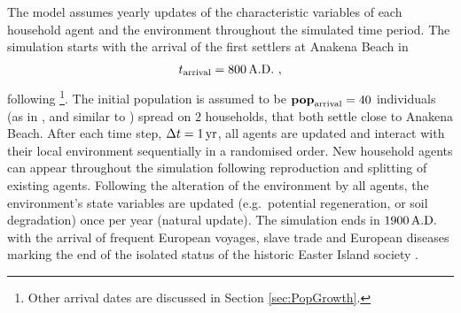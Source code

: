 The model assumes yearly updates of the characteristic variables of each household agent and the environment throughout the simulated time period.
The simulation starts with the arrival of the first settlers at Anakena Beach in
\begin{equation}
t_\text{arrival} = 800\, {\rm A.D.}\ ,
\end{equation}
following \citet{Bahn2017}\footnote{Other arrival dates are discussed in Section \ref{sec:PopGrowth}.}.
The initial population is assumed to be $\mathbf{pop}_{\rm arrival} = 40$ individuals (as in \citet{Brander1998}, and similar to \citet{Brandt2015}) spread on $2$ households, that both settle close to Anakena Beach.
After each time step, $\Delta t=1\,{\rm yr}$, all agents are updated and interact with their local environment sequentially in a randomised order. 
New household agents can appear throughout the simulation following reproduction and splitting of existing agents. 
Following the alteration of the environment by all agents, the environment's state variables are updated (e.g.\ potential regeneration, or soil degradation) once per year (natural update).
The simulation ends in $1900\, {\rm A.D.}$ with the arrival of frequent European voyages, slave trade and European diseases marking the end of the isolated status of the historic Easter Island society .%

